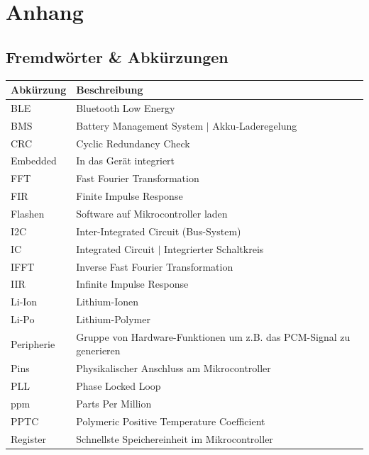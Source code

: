\documentclass[12pt]{article}
\begin{document}
	\newpage
	\section{Anhang}
	
	
	
	\newpage
	\listoffigures
	
	\newpage
	
	\subsection*{Fremdwörter \& Abkürzungen}
	\begin{table}[H]
		\centering
		\begin{tabular}{|l|p{}|}
			\hline
			\textbf{Abkürzung} & \textbf{Beschreibung} \\ \hline
			BLE & Bluetooth Low Energy \\ \hline
			BMS & Battery Management System $\vert$ Akku-Laderegelung \\ \hline
			CRC & Cyclic Redundancy Check \\ \hline
			Embedded & In das Gerät integriert \\ \hline
			FFT & Fast Fourier Transformation \\ \hline
			FIR & Finite Impulse Response \\ \hline
			Flashen & Software auf Mikrocontroller laden \\ \hline
			I2C & Inter-Integrated Circuit (Bus-System) \\ \hline
			IC & Integrated Circuit $\vert$ Integrierter Schaltkreis \\ \hline
			IFFT & Inverse Fast Fourier Transformation \\ \hline
			IIR & Infinite Impulse Response \\ \hline
			Li-Ion & Lithium-Ionen \\ \hline
			Li-Po & Lithium-Polymer \\ \hline
			Peripherie & Gruppe von Hardware-Funktionen um z.B. das PCM-Signal zu generieren \\ \hline
			Pins & Physikalischer Anschluss am Mikrocontroller \\ \hline
			PLL & Phase Locked Loop \\ \hline
			ppm & Parts Per Million \\ \hline
			PPTC & Polymeric Positive Temperature Coefficient \\ \hline
			Register & Schnellste Speichereinheit im Mikrocontroller \\ \hline

\end{tabular}
\end{table}
\end{document}
